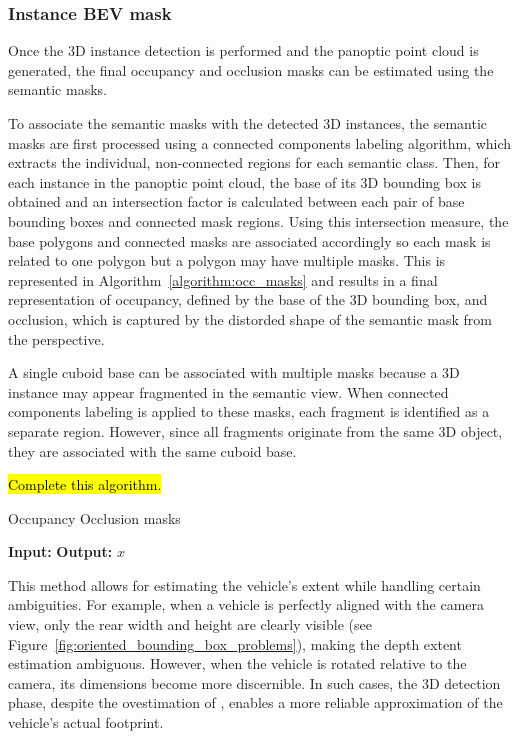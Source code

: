 \subsubsection{Instance BEV mask}
Once the 3D instance detection is performed and the panoptic point cloud is generated, the final occupancy and occlusion masks can be estimated using the semantic  masks.

To associate the  semantic masks with the detected 3D instances, the semantic masks are first processed using a connected components labeling algorithm, which extracts the individual, non-connected regions for each semantic class. Then, for each instance in the panoptic point cloud, the base of its 3D bounding box is obtained and an intersection factor is calculated between each pair of base bounding boxes and connected mask regions. Using this intersection measure, the base polygons and connected masks are associated accordingly so each mask is related to one polygon but a polygon may have multiple masks. This is represented in Algorithm~\ref{algorithm:occ_masks} and results in a final representation of occupancy, defined by the base of the 3D bounding box, and occlusion, which is captured by the distorded shape of the semantic mask from the  perspective.

A single cuboid base can be associated with multiple  masks because a 3D instance may appear fragmented in the  semantic view. When connected components labeling is applied to these masks, each fragment is identified as a separate region. However, since all fragments originate from the same 3D object, they are associated with the same cuboid base.

\hl{Complete this algorithm.}
\begin{algorithm}
    \caption{Occupancy Occlusion masks}
    \label{algorithm:occ_masks}
    \footnotesize

    \begin{algorithmic}[1]
        \State \textbf{Input:} 
        \State \textbf{Output:} 
        \State \Return $x$
    \end{algorithmic}
\end{algorithm}

This method allows for estimating the vehicle’s extent while handling certain ambiguities. For example, when a vehicle is perfectly aligned with the camera view, only the rear width and height are clearly visible (see Figure~\ref{fig:oriented_bounding_box_problems}), making the depth extent estimation ambiguous. However, when the vehicle is rotated relative to the camera, its dimensions become more discernible. In such cases, the 3D detection phase, despite the ovestimation of , enables a more reliable approximation of the vehicle's actual footprint.


